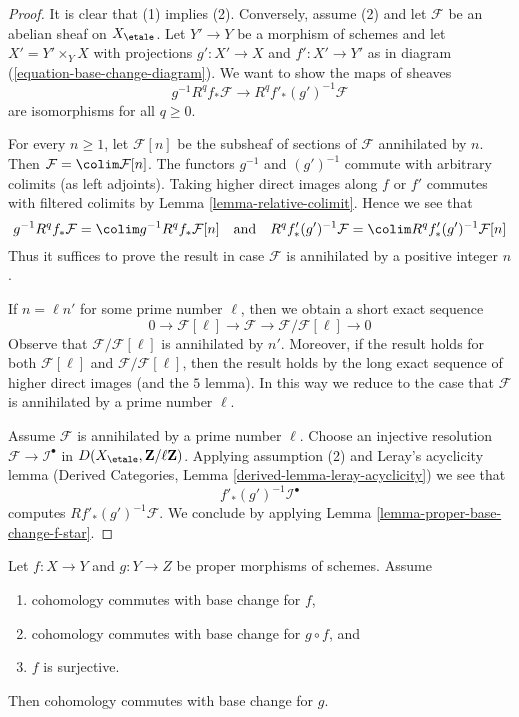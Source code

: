 \begin{proof}
It is clear that (1) implies (2). Conversely, assume (2) and let
$\mathcal{F}$ be an abelian sheaf on $X_\etale$. Let $Y' \to Y$
be a morphism of schemes and let $X' = Y' \times_Y X$
with projections $g' : X' \to X$ and $f' : X' \to Y'$ as in
diagram (\ref{equation-base-change-diagram}).
We want to show the maps of sheaves
$$
g^{-1}R^qf_*\mathcal{F} \longrightarrow R^qf'_*(g')^{-1}\mathcal{F}
$$
are isomorphisms for all $q \geq 0$.

\medskip\noindent
For every $n \geq 1$, let $\mathcal{F}[n]$ be the subsheaf of sections
of $\mathcal{F}$ annihilated by $n$. Then
$\mathcal{F} = \colim \mathcal{F}[n]$.
The functors $g^{-1}$ and $(g')^{-1}$ commute with arbitrary colimits
(as left adjoints). Taking higher direct images along $f$ or $f'$
commutes with filtered colimits by Lemma \ref{lemma-relative-colimit}.
Hence we see that
$$
g^{-1}R^qf_*\mathcal{F} = \colim g^{-1}R^qf_*\mathcal{F}[n]
\quad\text{and}\quad
R^qf'_*(g')^{-1}\mathcal{F} =
\colim R^qf'_*(g')^{-1}\mathcal{F}[n]
$$
Thus it suffices to prove the result in case $\mathcal{F}$ is
annihilated by a positive integer $n$.

\medskip\noindent
If $n = \ell n'$ for some prime number $\ell$, then we obtain a short
exact sequence
$$
0 \to \mathcal{F}[\ell] \to \mathcal{F} \to
\mathcal{F}/\mathcal{F}[\ell] \to 0
$$
Observe that $\mathcal{F}/\mathcal{F}[\ell]$ is annihilated by $n'$.
Moreover, if the result holds for both $\mathcal{F}[\ell]$ and
$\mathcal{F}/\mathcal{F}[\ell]$, then the result holds by
the long exact sequence of higher direct images (and the $5$ lemma).
In this way we reduce to the case that $\mathcal{F}$ is annihilated
by a prime number $\ell$.

\medskip\noindent
Assume $\mathcal{F}$ is annihilated by a prime number $\ell$.
Choose an injective resolution $\mathcal{F} \to \mathcal{I}^\bullet$
in $D(X_\etale, \mathbf{Z}/\ell\mathbf{Z})$. Applying assumption
(2) and Leray's acyclicity lemma
(Derived Categories, Lemma \ref{derived-lemma-leray-acyclicity})
we see that
$$
f'_*(g')^{-1}\mathcal{I}^\bullet
$$
computes $Rf'_*(g')^{-1}\mathcal{F}$. We conclude by applying
Lemma \ref{lemma-proper-base-change-f-star}.
\end{proof}

\begin{lemma}
\label{lemma-sandwich}
Let $f : X \to Y$ and $g : Y \to Z$ be proper morphisms of schemes. Assume
\begin{enumerate}
\item cohomology commutes with base change for $f$,
\item cohomology commutes with base change for $g \circ f$, and
\item $f$ is surjective.
\end{enumerate}
Then cohomology commutes with base change for $g$.
\end{lemma}

